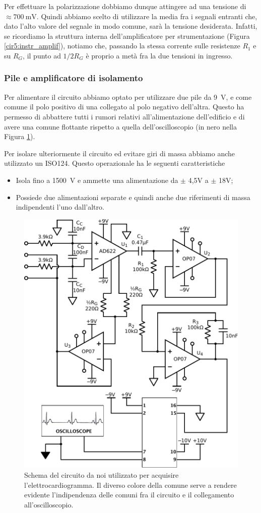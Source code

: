 Per effettuare la polarizzazione dobbiamo dunque attingere ad una tensione di $\approx \SI{700}{\milli\volt}$. Quindi abbiamo scelto di utilizzare la media fra i segnali entranti che, dato l'alto valore del segnale in modo comune, sarà la tensione desiderata. Infatti, se ricordiamo la struttura interna dell'amplificatore per strumentazione (Figura \ref{cir5:instr_amplif}), notiamo che, passando la stessa corrente sulle resistenze $R_1$ e su $R_G$, il punto ad $1/2 R_G$ è proprio a metà fra la due tensioni in ingresso.

\subsubsection*{Pile e amplificatore di isolamento}

Per alimentare il circuito abbiamo optato per utilizzare due pile da \SI{9}{\volt}, e come comune il polo positivo di una collegato al polo negativo dell'altra. Questo ha permesso di abbattere tutti i rumori relativi all'alimentazione dell'edificio e di avere una comune flottante rispetto a quella dell'oscilloscopio (in nero nella Figura \ref{cir7:elettro-cardiogramma}).

Per isolare ulteriormente il circuito ed evitare giri di massa abbiamo anche utilizzato un ISO124. Questo operazionale ha le seguenti caratteristiche
\begin{itemize}[noitemsep]
	\item Isola fino a \SI{1500}{\volt} e ammette una alimentazione da $\pm$ 4,5V a $\pm$ 18V;
	\item Possiede due alimentazioni separate e quindi anche due riferimenti di massa indipendenti l'uno dall'altro.
\end{itemize}

\begin{figure}[tpc]
\centering
\includegraphics[width=.6\textwidth]{../E07/latex/circuito.pdf}
\caption{Schema del circuito da noi utilizzato per acquisire l'elettrocardiogramma. Il diverso colore della comune serve a rendere evidente l'indipendenza delle comuni fra il circuito e il collegamento all'oscilloscopio.}
\label{cir7:elettro-cardiogramma}
\end{figure}

